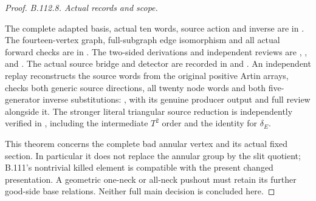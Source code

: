 \begin{proof}
\emph{B.112.8. Actual records and scope.}
\begin{raggedright}
The complete adapted basis, actual ten words, source action and
inverse are in
.
The fourteen-vertex graph, full-subgraph edge isomorphism and all
actual forward checks are in
.
The two-sided derivations and independent reviews are
,
,
 and
.
The actual source bridge and detector are recorded in
 and
.
An independent replay reconstructs the source words from the original
positive Artin arrays, checks both generic source directions, all
twenty node words and both five-generator inverse substitutions:
,
with its genuine producer output and full review alongside it.
The stronger literal triangular source reduction is independently
verified in , including
the intermediate $T^2$ order and the identity for $\delta_E$.
\par\end{raggedright}

This theorem concerns the complete bad annular vertex and its actual
fixed section. In particular it does not replace the annular group
by the slit quotient; B.111's nontrivial killed element is compatible
with the present changed presentation. A geometric one-neck or
all-neck pushout must retain its further good-side base relations.
Neither full main decision is concluded here.
\end{proof}
